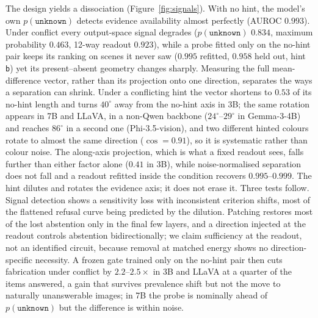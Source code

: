 \documentclass[10pt]{article}
\newcommand{\unknown}{\texttt{unknown}}
\newcommand{\punk}{p(\unknown)}
\begin{document}
The design yields a dissociation (Figure~\ref{fig:signals}). With no hint, the model's own $\punk$ detects evidence availability almost perfectly (AUROC $0.993$). Under conflict every output-space signal degrades ($\punk$ $0.834$, maximum probability $0.463$, 12-way readout $0.923$), while a probe fitted only on the no-hint pair keeps its ranking on scenes it never saw ($0.995$ refitted, $0.958$ held out, hint \texttt{b}) yet its present--absent geometry changes sharply. Measuring the full mean-difference vector, rather than its projection onto one direction, separates the ways a separation can shrink. Under a conflicting hint the vector shortens to $0.53$ of its no-hint length and turns $40^\circ$ away from the no-hint axis in 3B; the same rotation appears in 7B and LLaVA, in a non-Qwen backbone ($24^\circ$--$29^\circ$ in Gemma-3-4B) and reaches $86^\circ$ in a second one (Phi-3.5-vision), and two different hinted colours rotate to almost the same direction ($\cos=0.91$), so it is systematic rather than colour noise. The along-axis projection, which is what a fixed readout sees, falls further than either factor alone ($0.41$ in 3B), while noise-normalised separation does not fall and a readout refitted inside the condition recovers $0.995$--$0.999$. The hint dilutes and rotates the evidence axis; it does not erase it. Three tests follow. Signal detection shows a sensitivity loss with inconsistent criterion shifts, most of the flattened refusal curve being predicted by the dilution. Patching restores most of the lost abstention only in the final few layers, and a direction injected at the readout controls abstention bidirectionally; we claim sufficiency at the readout, not an identified circuit, because removal at matched energy shows no direction-specific necessity. A frozen gate trained only on the no-hint pair then cuts fabrication under conflict by $2.2$--$2.5\times$ in 3B and LLaVA at a quarter of the items answered, a gain that survives prevalence shift but not the move to naturally unanswerable images; in 7B the probe is nominally ahead of $\punk$ but the difference is within noise.
\end{document}
